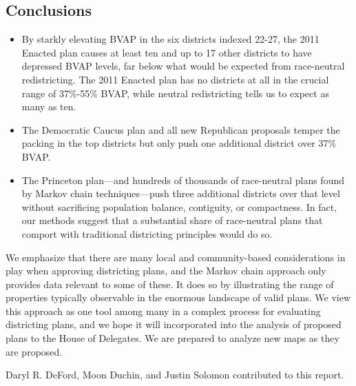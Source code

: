 \documentclass{mgggarticle}
\begin{document}
\subsection{Conclusions}

\begin{itemize}
    \item By starkly elevating BVAP in the six districts indexed 22-27, the 2011 Enacted plan causes at
least ten and up to 17 other districts to have depressed BVAP levels, far below what would be
expected from race-neutral redistricting. The 2011 Enacted plan has no districts at all in the
crucial range of 37\%-55\% BVAP, while neutral redistricting tells us to expect as many as ten.

    \item The Democratic Caucus plan and all new Republican proposals temper the packing in the top
districts but only push one additional district over 37\% BVAP.

    \item The Princeton plan—and hundreds of thousands of race-neutral plans found by Markov chain
techniques—push three additional districts over that level without sacrificing population balance,
contiguity, or compactness. In fact, our methods suggest that a substantial share of race-neutral
plans that comport with traditional districting principles would do so.
\end{itemize}

We emphasize that there are many local and community-based considerations in play when
approving districting plans, and the Markov chain approach only provides data relevant to some
of these. It does so by illustrating the range of properties typically observable in the enormous
landscape of valid plans. We view this approach as one tool among many in a complex process for
evaluating districting plans, and we hope it will incorporated into the analysis of proposed plans
to the House of Delegates. We are prepared to analyze new maps as they are proposed.

\begin{contributors}
Daryl R. DeFord, Moon Duchin, and Justin Solomon contributed to this report.
\end{contributors}
\end{document}
